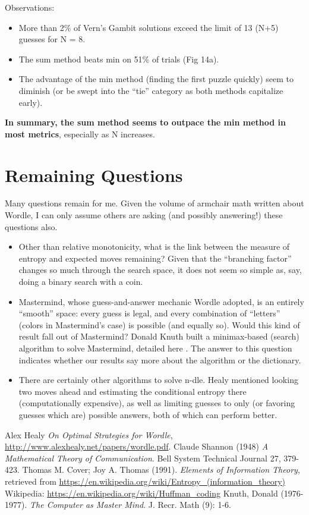 \documentclass[11pt, oneside]{article} 	%
\begin{document}
Observations:
\begin{itemize}
\item More than 2\% of Vern's Gambit solutions exceed the limit of 13 (N+5) guesses for N = 8.
\item The sum method beats min on 51\% of trials (Fig 14a).  
\item The advantage of the min method (finding the first puzzle quickly) seem to diminish (or be swept into the ``tie'' category as both methods capitalize early).
\end{itemize}


\textbf{In summary, the sum method seems to outpace the min method in most metrics}, especially as N increases.

\section{Remaining Questions}

Many questions remain for me. Given the volume of armchair math written about Wordle, I can only assume others are asking (and possibly answering!) these questions also.

\begin{itemize}
\item Other than relative monotonicity, what is the link between the measure of entropy and expected moves remaining? Given that the ``branching factor'' changes so much through the search space, it does not seem so simple as, say, doing a binary search with a coin.
\item Mastermind, whose guess-and-answer mechanic Wordle adopted, is an entirely ``smooth'' space: every guess is legal, and every combination of ``letters'' (colors in Mastermind's case) is possible (and equally so). Would this kind of result fall out of Mastermind? Donald Knuth built a minimax-based (search) algorithm to solve Mastermind, detailed here \cite{5}. The answer to this question indicates whether our results say more about the algorithm or the dictionary.
\item There are certainly other algorithms to solve n-dle. Healy \cite{1} mentioned looking two moves ahead and estimating the conditional entropy there (computationally expensive), as well as limiting guesses to only (or favoring guesses which are) possible answers, both of which can perform better.
\end{itemize}

\begin{thebibliography}{9}

Alex Healy \emph{On Optimal Strategies for Wordle}, \url{http://www.alexhealy.net/papers/wordle.pdf}.
Claude Shannon (1948) \emph{A Mathematical Theory of Communication}. Bell System Technical Journal 27, 379-423.
Thomas M. Cover; Joy A. Thomas (1991). \emph{Elements of Information Theory}, retrieved from \url{https://en.wikipedia.org/wiki/Entropy_(information_theory)}
Wikipedia: \url{https://en.wikipedia.org/wiki/Huffman_coding}
Knuth, Donald (1976-1977). \emph{The Computer as Master Mind}. J. Recr. Math (9): 1-6.
\end{thebibliography}
\end{document}
